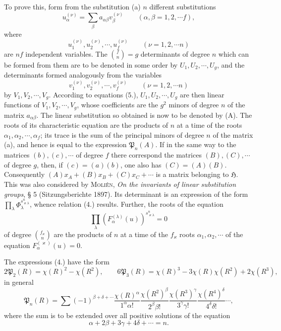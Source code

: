 \documentclass[11pt]{article}
\newcommand{\Hgr}{\mathfrak{H}}
\newcommand{\FrobP}{\mathfrak{P}}
\begin{document}
To prove this, form from the substitution (a) $n$ different substitutions
\begin{equation*}\tag{5.}
u_\alpha^{(\nu)}=\sum_\beta a_{\alpha\beta}v_\beta^{(\nu)}
\qquad(\alpha,\beta=1,2,\cdots f),
\end{equation*}
where
\[
u_1^{(\nu)},u_2^{(\nu)},\cdots,u_f^{(\nu)}
\qquad(\nu=1,2,\cdots n)
\]
are $nf$ independent variables. The $\binom{f}{n}=g$ determinants of degree $n$ which can be formed from them are to be denoted in some order by $U_1,U_2,\cdots,U_g$, and the determinants formed analogously from the variables
\[
v_1^{(\nu)},v_2^{(\nu)},\cdots,v_f^{(\nu)}
\qquad(\nu=1,2,\cdots n)
\]
by $V_1,V_2,\cdots,V_g$. According to equations (5.), $U_1,U_2,\cdots,U_g$ are then linear functions of $V_1,V_2,\cdots,V_g$, whose coefficients are the $g^2$ minors of degree $n$ of the matrix $a_{\alpha\beta}$. The linear substitution so obtained is now to be denoted by (A). The roots of its characteristic equation are the products of $n$ at a time of the roots $\alpha_1,\alpha_2,\cdots,\alpha_f$; its trace is the sum of the principal minors of degree $n$ of the matrix (a), and hence is equal to the expression $\FrobP_n(A)$. If in the same way to the matrices $(b),(c),\cdots$ of degree $f$ there correspond the matrices $(B),(C),\cdots$ of degree $g$, then, if $(c)=(a)(b)$, one also has $(C)=(A)(B)$. Consequently $(A)x_A+(B)x_B+(C)x_C+\cdots$ is a matrix belonging to $\Hgr$. This was also considered by \textsc{Moliên}, \emph{On the invariants of linear substitution groups}, § 5 (Sitzungsberichte 1897). Its determinant is an expression of the form $\prod_\lambda\Phi_\lambda^{s_{\varkappa\lambda}^{n}}$, whence relation (4.) results. Further, the roots of the equation
\[
\prod_\lambda\left(F_\alpha^{(\lambda)}(u)\right)^{s_{\varkappa\lambda}^{n}}=0
\]
of degree $\binom{f_\varkappa}{n}$ are the products of $n$ at a time of the $f_\varkappa$ roots $\alpha_1,\alpha_2,\cdots$ of the equation $F_\alpha^{(\varkappa)}(u)=0$.

The expressions (4.) have the form
\begin{equation*}\tag{6.}
2\FrobP_2(R)=\chi(R)^2-\chi(R^2),\qquad
6\FrobP_3(R)=\chi(R)^3-3\chi(R)\chi(R^2)+2\chi(R^3),
\end{equation*}
in general
\begin{equation*}\tag{7.}
\FrobP_n(R)=\sum (-1)^{\beta+\delta+\cdots}
\frac{\chi(R)^\alpha}{1^\alpha\alpha!}
\frac{\chi(R^2)^\beta}{2^\beta\beta!}
\frac{\chi(R^3)^\gamma}{3^\gamma\gamma!}
\frac{\chi(R^4)^\delta}{4^\delta\delta!}\cdots,
\end{equation*}
where the sum is to be extended over all positive solutions of the equation
\begin{equation*}\tag{8.}
\alpha+2\beta+3\gamma+4\delta+\cdots=n.
\end{equation*}
\end{document}
